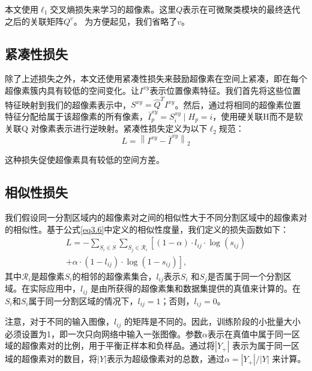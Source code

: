 本文使用$\ell_1$交叉熵损失来学习的超像素。这里$Q$表示在可微聚类模块的最终迭代之后的关联矩阵$Q^{v}$。
为方便起见，我们省略了$v$。

\subsection{紧凑性损失}

除了上述损失之外，本文还使用紧凑性损失来鼓励超像素在空间上紧凑，即在每个超像素簇内具有较低的空间变化。让$I^{xy}$表示位置像素特征。我们首先将这些位置特征映射到我们的超像素表示中，$S^{xy}=\hat{Q}^{T}I^{xy}$。然后，通过将相同的超像素位置特征分配给属于该超像素的所有像素，$\bar{I}_{p}^{xy} = S_{i}^{xy}\mid H_{p}=i$，使用硬关联H而不是软关联Q 对像素表示进行逆映射。紧凑性损失定义为以下$\ell_2$规范：
\begin{equation}
L = \left \|I^{xy}-\bar{I}^{xy} \right \|_{2}
\end{equation}

这种损失促使超像素具有较低的空间方差。

\subsection{相似性损失}
我们假设同一分割区域内的超像素对之间的相似性大于不同分割区域中的超像素对的相似性。基于公式\ref{eq3.6}中定义的相似性度量，我们定义的损失函数如下：
\begin{equation}
\begin{split}
 L =  - \sum_{S_{i}\in S}\sum_{S_{j}\in \mathcal{R}_{i}}   \left[   { \left(
 1  -\alpha  \right)\cdot l_{ij}\cdot \log \left( s_{ij} \right)  } \right. \\
 \left. {  + \alpha \cdot \left( 1-l_{ij}\right) \cdot \log \left( 1- s_{ij}\right)  }   \right],
\end{split}
\end{equation}
其中$\mathcal{R}_{i}$是超像素$S_{i}$的相邻的超像素集合，$l_{ij}$表示$S_i$ 和$S_j$是否属于同一个分割区域。在实际应用中，$l_{ij}$ 是由所获得的超像素集和数据集提供的真值来计算的。在$S_i$和$S_i$属于同一分割区域的情况下，$l_{ij} = 1$；否则，$l_{ij} = 0$。

注意，对于不同的输入图像，$l_{ij}$ 的矩阵是不同的。因此，训练阶段的小批量大小必须设置为1，即一次只向网络中输入一张图像。参数$\alpha$表示在真值中属于同一区域的超像素对的比例，用于平衡正样本和负样品。通过将$|Y_+|$ 表示为属于同一区域的超像素对的数目，将$|Y|$表示为超级像素对的总数，通过$\alpha  = \left | Y_{+}\right | / \left | Y \right |$ 来计算。

